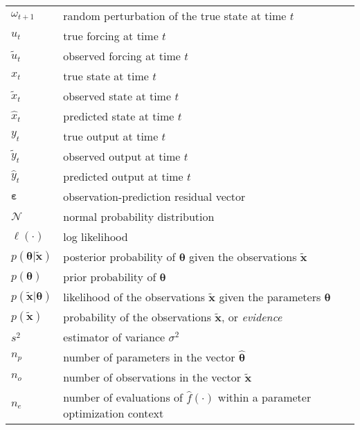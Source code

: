 \begin{center}
\begin{longtable}{lp{10cm}}
$\omega_{t+1}$&random perturbation of the true state at time $t$\\
$u_t$&true forcing at time $t$\\
$\tilde{u}_t$&observed forcing at time $t$\\
$x_t$&true state at time $t$\\
$\tilde{x}_t$&observed state at time $t$\\
$\hat{x}_t$&predicted state at time $t$\\
$y_t$&true output at time $t$\\
$\tilde{y}_t$&observed output at time $t$\\
$\hat{y}_t$&predicted output at time $t$\\
$\boldsymbol\varepsilon$&observation-prediction residual vector\\
$\mathcal{N}$&normal probability distribution\\
$\ell(\cdot{})$&log likelihood\\
$p(\boldsymbol\theta|\tilde{\mathbf{x}})$&posterior probability of $\boldsymbol{\theta}$ given the observations $\tilde{\mathbf{x}}$\\
$p(\boldsymbol\theta)$&prior probability of $\boldsymbol{\theta}$\\
$p(\tilde{\mathbf{x}}|\boldsymbol\theta)$&likelihood of the observations $\tilde{\mathbf{x}}$ given the parameters $\boldsymbol{\theta}$\\
$p(\tilde{\mathbf{x}})$&probability of the observations $\tilde{\mathbf{x}}$, or \textit{evidence}\\
$s^2$&estimator of variance $\sigma^2$\\
$n_p$&number of parameters in the vector $\hat{\boldsymbol{\theta}}$\\
$n_o$&number of observations in the vector $\tilde{\mathbf{x}}$\\
$n_e$&number of evaluations of $\hat{f}(\cdot{})$ within a parameter optimization context\\
\end{longtable}
\end{center}
